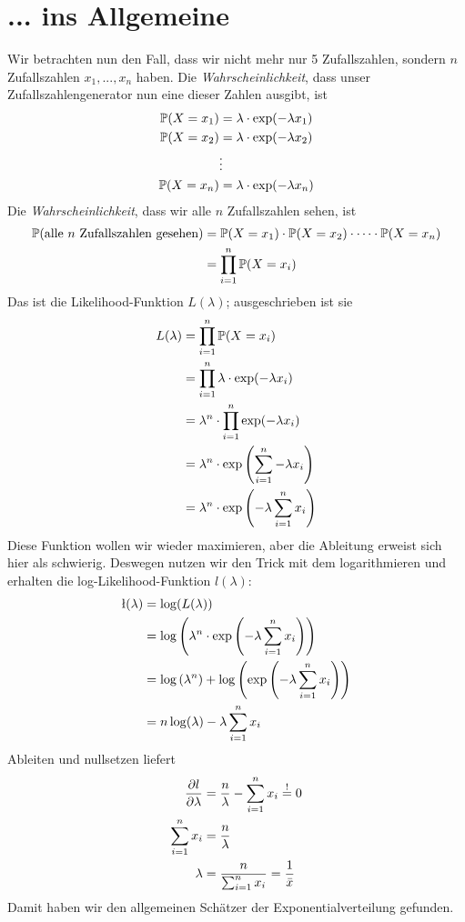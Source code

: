 \documentclass{article}
\begin{document}
	\section*{... ins Allgemeine}
	
	Wir betrachten nun den Fall, dass wir nicht mehr nur 5 Zufallszahlen, sondern $n$ Zufallszahlen $x_1, ..., x_n$ haben. Die \textit{Wahrscheinlichkeit}, dass unser Zufallszahlengenerator nun eine dieser Zahlen ausgibt, ist
	\begin{align}
		\mathbb{P}(X=x_1) &= \lambda\cdot\exp(-\lambda x_1) \notag \\
		\mathbb{P}(X=x_2) &= \lambda\cdot\exp(-\lambda x_2) \notag \\
		&\vdots \notag \\
		\mathbb{P}(X=x_n) &= \lambda\cdot\exp(-\lambda x_n) \notag
	\end{align}
	Die \textit{Wahrscheinlichkeit}, dass wir alle $n$ Zufallszahlen sehen, ist
	\begin{align}
		\mathbb{P}(\text{alle $n$ Zufallszahlen gesehen}) &= \mathbb{P}(X=x_1) \cdot \mathbb{P}(X=x_2)\cdot\dots\cdot \mathbb{P}(X=x_n) \notag \\
		&= \prod_{i=1}^{n} \mathbb{P}(X=x_i) \notag
	\end{align}
	Das ist die Likelihood-Funktion $L(\lambda)$; ausgeschrieben ist sie
	\begin{align}
		L(\lambda) &= \prod_{i=1}^n \mathbb{P}(X=x_i) \notag \\
		&= \prod_{i=1}^n \lambda\cdot\exp(-\lambda x_i) \notag \\
		&= \lambda^n \cdot\prod_{i=1}^n \exp(-\lambda x_i) \notag \\
		&= \lambda^n \cdot\exp\left(\sum_{i=1}^{n} -\lambda x_i\right) \notag \\
		&= \lambda^n\cdot\exp\left(-\lambda\sum_{i=1}^n x_i\right) \notag
	\end{align}
	Diese Funktion wollen wir wieder maximieren, aber die Ableitung erweist sich hier als schwierig. Deswegen nutzen wir den Trick mit dem logarithmieren und erhalten die log-Likelihood-Funktion $l(\lambda)$:
	\begin{align}
		\l(\lambda) &= \log(L(\lambda)) \notag \\
		&= \log\left(\lambda^n\cdot\exp\left(-\lambda\sum_{i=1}^n x_i\right)\right) \notag \\
		&= \log\left(\lambda^n\right) + \log\left(\exp\left(-\lambda\sum_{i=1}^n x_i\right)\right) \notag \\
		&= n\log(\lambda) - \lambda\sum_{i=1}^{n} x_i \notag
	\end{align}
	Ableiten und nullsetzen liefert
	\begin{align}
		\frac{\partial l}{\partial \lambda} &= \frac{n}{\lambda} - \sum_{i=1}^n x_i \overset{!}{=} 0 \notag \\
		\sum_{i=1}^n x_i &= \frac{n}{\lambda} \notag \\
		\lambda &= \frac{n}{\sum_{i=1}^n x_i} = \frac{1}{\bar{x}} \notag
	\end{align}
	Damit haben wir den allgemeinen Schätzer der Exponentialverteilung gefunden.
\end{document}
